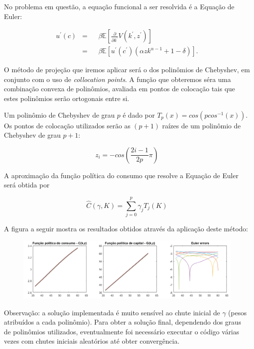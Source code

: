 \documentclass{article}
\begin{document}
No problema em questão, a equação funcional a ser resolvida é a Equação de Euler:

\begin{equation}
\begin{aligned}
u^{\prime}(c) & = & & \beta  \mathbb{E} [ \frac{\partial}{\partial k^{\prime}} V(k^{\prime},z^{\prime})] \\
      & = & & \beta  \mathbb{E} [u^{\prime}(c^{\prime}) (\alpha z k^{\alpha-1} + 1 - \delta)].
\end{aligned}
\end{equation}

O método de projeção que iremos aplicar será o dos polinômios de Chebyshev,
em conjunto com o uso de \textit{collocation points}. A função que obteremos
séra uma combinação convexa de polinômios, avaliada em pontos de colocação
tais que estes polinômios serão ortogonais entre si.

Um polinômio de Chebyshev de grau $p$ é dado por $T_p(x) = cos(p cos^{-1}(x))$.
Os pontos de colocação utilizados serão as $(p+1)$ raízes de um polinômio de Chebyshev
de grau $p+1$: 

$$ z_i = -cos\left(\frac{2i-1}{2p}\pi\right) $$

A aproximação da função política do consumo que resolve a Equação de Euler será
obtida por 

$$ \hat{C}(\gamma,K) = \sum_{j=0}^p \gamma_j T_j(K)$$

A figura a seguir mostra os resultados obtidos através da aplicação deste método:

\begin{figure}[h!]
  \includegraphics[width=\linewidth]{graf1.png}
\end{figure}

Observação: a solução implementada é muito sensível ao chute inicial 
de $\gamma$ (pesos atribuídos a cada polinômio). Para obter a solução
final, dependendo dos graus de polinômios utilizados, eventualmente 
foi necessário executar o código várias vezes com chutes iniciais
aleatórios até obter convergência. 
\end{document}
